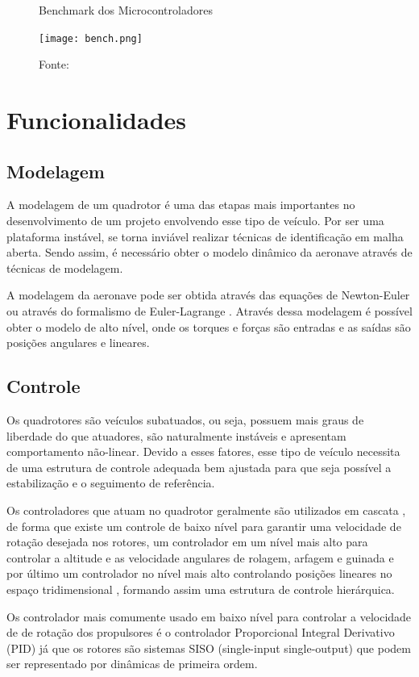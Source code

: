 \begin{figure} [h!]	
  \centering
  \caption{Benchmark dos Microcontroladores}
  \texttt{[image: bench.png]}
  \caption*{Fonte: \cite{benchmark}}
  \label{fig:BILI}
\end{figure}

\section{Funcionalidades}

\subsection{Modelagem}
A modelagem de um quadrotor é uma das etapas mais importantes no desenvolvimento de um projeto envolvendo esse tipo de veículo. Por ser uma plataforma instável, se torna inviável realizar técnicas de identificação em malha aberta. Sendo assim, é necessário obter o modelo dinâmico da aeronave através de técnicas de modelagem.

A modelagem da aeronave pode ser obtida através das equações de Newton-Euler ou através do formalismo de Euler-Lagrange \cite{castillo2005modelling} . Através dessa modelagem é possível obter o modelo de alto nível, onde os torques e forças são entradas e as saídas são posições angulares e lineares. 

\subsection{Controle}
Os quadrotores são veículos subatuados, ou seja, possuem mais graus de liberdade do que atuadores, são naturalmente instáveis e apresentam comportamento não-linear. Devido a esses fatores, esse tipo de veículo necessita de uma estrutura de controle adequada bem ajustada para que seja possível a estabilização e o seguimento de referência.

Os controladores que atuam no quadrotor geralmente são utilizados em cascata \cite{Nonami2010a}, de forma que existe um controle de baixo nível para garantir uma velocidade de rotação desejada nos rotores, um controlador em um nível mais alto para controlar a altitude e as velocidade angulares de rolagem, arfagem e guinada e por último um controlador no nível mais alto controlando posições lineares no espaço tridimensional \cite{Kendoul2007}, formando assim uma estrutura de controle hierárquica.

Os controlador mais comumente usado em baixo nível para controlar a velocidade de de rotação dos propulsores é o controlador Proporcional Integral Derivativo (PID) já que os rotores são sistemas SISO (single-input single-output) que podem ser representado por dinâmicas de primeira ordem.

